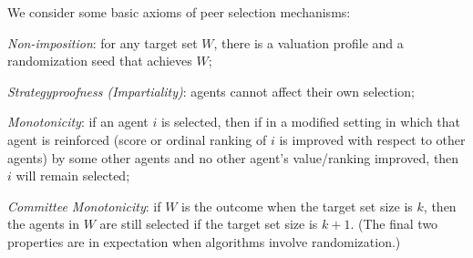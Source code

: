 \documentclass[letterpaper]{article}
\newcommand{\omer}[1]{\textcolor{purple}{\textbf{Omer Says: #1}}}
\begin{document}
We consider some basic axioms of peer selection mechanisms:
\begin{inparaenum}[(i)]
	\item \emph{Non-imposition}: for any target set $W$, there is a valuation profile and a randomization seed that achieves $W$;
	\item \emph{Strategyproofness (Impartiality)}: agents cannot affect their own selection;
	\item \emph{Monotonicity}: if an agent $i$ is selected, then if in a modified setting in which that agent is reinforced (score or ordinal ranking of $i$ is improved with respect to other agents) by some other agents and no other agent's value/ranking improved, then $i$ will remain selected;
	\item \emph{Committee Monotonicity}: if $W$ is the outcome when the target set size is $k$, then the agents in $W$ are still selected if the target set size is $k+1$. (The final two properties are in expectation when algorithms involve randomization.)
\end{inparaenum}


\end{document}
